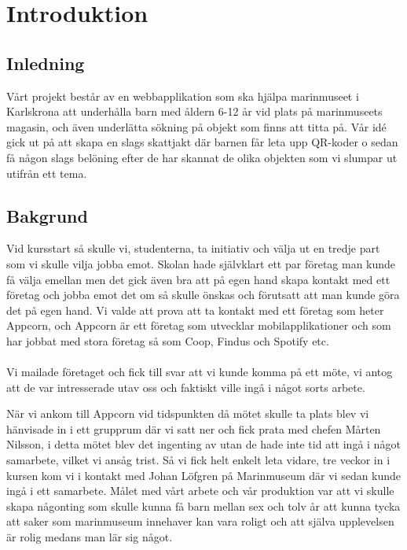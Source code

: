 \documentclass[12pt, titlepage]{article}
\begin{document}


\maketitle

\tableofcontents
\setcounter{page}{0}
\newpage
\section{Introduktion}
\subsection{Inledning}
Vårt projekt består av en webbapplikation som ska hjälpa marinmuseet i Karlskrona att underhålla 
barn med åldern 6-12 år vid plats på marinmuseets magasin, och även underlätta sökning på objekt 
som finns att titta på. Vår idé gick ut på att skapa en slags skattjakt där barnen får 
leta upp QR-koder o sedan få någon slags belöning efter de har skannat de olika objekten som 
vi slumpar ut utifrån ett tema.

\subsection{Bakgrund}
Vid kursstart så skulle vi, studenterna, ta initiativ och välja ut en tredje part 
som vi skulle vilja jobba emot. Skolan hade självklart ett par företag man kunde 
få välja emellan men det gick även bra att på egen hand skapa kontakt med 
ett företag och jobba emot det om så skulle önskas och förutsatt att man kunde göra 
det på egen hand. Vi valde att prova att ta kontakt med ett företag som heter Appcorn, 
och Appcorn är ett företag som utvecklar mobilapplikationer och som har jobbat med stora 
företag så som Coop, Findus och Spotify etc.
\\
\\
Vi mailade företaget och fick till svar att vi kunde komma på ett möte, 
vi antog att de var intresserade utav oss och faktiskt ville ingå i något sorts arbete. 

När vi ankom till Appcorn vid tidspunkten då mötet skulle ta plats blev vi hänvisade 
in i ett grupprum där vi satt ner och fick prata med chefen Mårten Nilsson, 
i detta mötet blev det ingenting av utan de hade inte tid att ingå i något samarbete, 
vilket vi ansåg trist. Så vi fick helt enkelt leta vidare, tre veckor in i kursen kom vi 
i kontakt med Johan Löfgren på Marinmuseum där vi sedan kunde ingå i ett samarbete. 
Målet med vårt arbete och vår produktion var att vi skulle skapa någonting som skulle kunna 
få barn mellan sex och tolv år att kunna tycka att saker som marinmuseum innehaver kan vara 
roligt och att själva upplevelsen är rolig medans man lär sig något.
\end{document}
